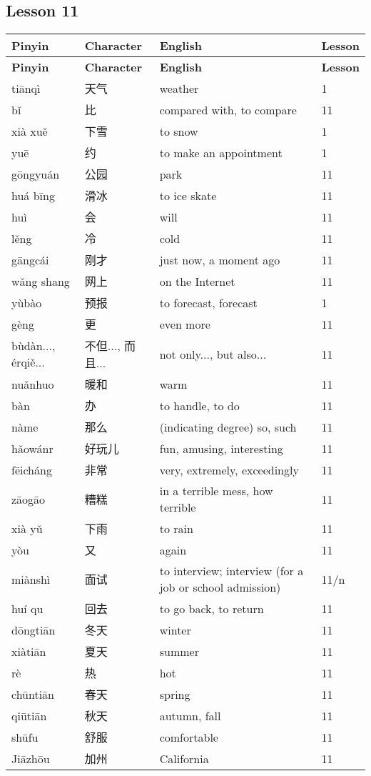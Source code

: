 \documentclass[12pt]{article}
\newcommand{\vocabitem}[4]{%
  #1 & #2 & #3 & #4 \\ \midrule
}
\begin{document}
\subsection*{Lesson 11}
\begin{longtable}{P{\dimexpr\textwidth/4\relax}P{\dimexpr\textwidth/4\relax}P{\dimexpr\textwidth/4\relax}P{\dimexpr\textwidth/4\relax}}
\toprule
\textbf{Pinyin} & \textbf{Character} & \textbf{English} & \textbf{Lesson} \\
\midrule
\endfirsthead
\toprule
\textbf{Pinyin} & \textbf{Character} & \textbf{English} & \textbf{Lesson} \\
\midrule
\endhead
\vocabitem{tiānqì}{天气}{weather}{1}
\vocabitem{bǐ}{比}{compared with, to compare}{11}
\vocabitem{xià xuě}{下雪}{to snow}{1}
\vocabitem{yuē}{约}{to make an appointment}{1}
\vocabitem{gōngyuán}{公园}{park}{11}
\vocabitem{huá bīng}{滑冰}{to ice skate}{11}
\vocabitem{huì}{会}{will}{11}
\vocabitem{lěng}{冷}{cold}{11}
\vocabitem{gāngcái}{刚才}{just now, a moment ago}{11}
\vocabitem{wǎng shang}{网上}{on the Internet}{11}
\vocabitem{yùbào}{预报}{to forecast, forecast}{1}
\vocabitem{gèng}{更}{even more}{11}
\vocabitem{bùdàn..., érqiě...}{不但..., 而且...}{not only..., but also...}{11}
\vocabitem{nuǎnhuo}{暖和}{warm}{11}
\vocabitem{bàn}{办}{to handle, to do}{11}
\vocabitem{nàme}{那么}{(indicating degree) so, such}{11}
\vocabitem{hǎowánr}{好玩儿}{fun, amusing, interesting}{11}
\vocabitem{fēicháng}{非常}{very, extremely, exceedingly}{11}
\vocabitem{zāogāo}{糟糕}{in a terrible mess, how terrible}{11}
\vocabitem{xià yǔ}{下雨}{to rain}{11}
\vocabitem{yòu}{又}{again}{11}
\vocabitem{miànshì}{面试}{to interview; interview (for a job or school admission)}{11/n}
\vocabitem{huí qu}{回去}{to go back, to return}{11}
\vocabitem{dōngtiān}{冬天}{winter}{11}
\vocabitem{xiàtiān}{夏天}{summer}{11}
\vocabitem{rè}{热}{hot}{11}
\vocabitem{chūntiān}{春天}{spring}{11}
\vocabitem{qiūtiān}{秋天}{autumn, fall}{11}
\vocabitem{shūfu}{舒服}{comfortable}{11}
\vocabitem{Jiāzhōu}{加州}{California}{11}
\end{longtable}
\end{document}
